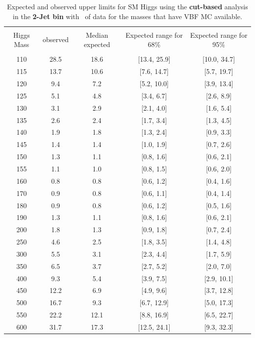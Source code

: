 \begin{table}[hbp!]
\begin{center}
\begin{tabular}{c c c c c}
\hline
\vspace{-3mm} && \\
 Higgs Mass & observed  & Median expected & Expected range for 68\% & Expected range for 95\%   \\
\vspace{-3mm} && \\
\hline
110 & 28.5 & 18.6 & [13.4, 25.9] & [10.0, 34.7] \\
115 & 13.7 & 10.6 & [7.6, 14.7] & [5.7, 19.7] \\
120 & 9.4 & 7.2 & [5.2, 10.0] & [3.9, 13.4] \\
125 & 5.1 & 4.8 & [3.4, 6.7] & [2.6, 8.9] \\
130 & 3.1 & 2.9 & [2.1, 4.0] & [1.6, 5.4] \\
135 & 2.6 & 2.4 & [1.7, 3.4] & [1.3, 4.5] \\
140 & 1.9 & 1.8 & [1.3, 2.4] & [0.9, 3.3] \\
145 & 1.4 & 1.4 & [1.0, 1.9] & [0.7, 2.6] \\
150 & 1.3 & 1.1 & [0.8, 1.6] & [0.6, 2.1] \\
155 & 1.1 & 1.0 & [0.8, 1.5] & [0.6, 2.0] \\
160 & 0.8 & 0.8 & [0.6, 1.2] & [0.4, 1.6] \\
170 & 0.9 & 0.8 & [0.6, 1.1] & [0.4, 1.4] \\
180 & 0.9 & 0.8 & [0.6, 1.2] & [0.5, 1.6] \\
190 & 1.3 & 1.1 & [0.8, 1.6] & [0.6, 2.1] \\
200 & 1.8 & 1.3 & [0.9, 1.8] & [0.7, 2.4] \\
250 & 4.6 & 2.5 & [1.8, 3.5] & [1.4, 4.8] \\
300 & 5.5 & 3.1 & [2.3, 4.4] & [1.7, 5.9] \\
350 & 6.5 & 3.7 & [2.7, 5.2] & [2.0, 7.0] \\
400 & 9.3 & 5.4 & [3.9, 7.5] & [2.9, 10.1] \\
450 & 12.2 & 6.9 & [4.9, 9.6] & [3.7, 12.8] \\
500 & 16.7 & 9.3 & [6.7, 12.9] & [5.0, 17.3] \\
550 & 22.2 & 12.1 & [8.8, 16.9] & [6.5, 22.7] \\
600 & 31.7 & 17.3 & [12.5, 24.1] & [9.3, 32.3] \\
\hline
\end{tabular}
\caption{Expected and observed upper limits for SM Higgs using the
  {\bf cut-based} analysis in the {\bf 2-Jet bin} with \intlumiEightTeV\ of data for the 
 masses that have VBF MC available. }
\label{tab:cutbase_uls_2j}
\end{center}
\end{table}
\clearpage


